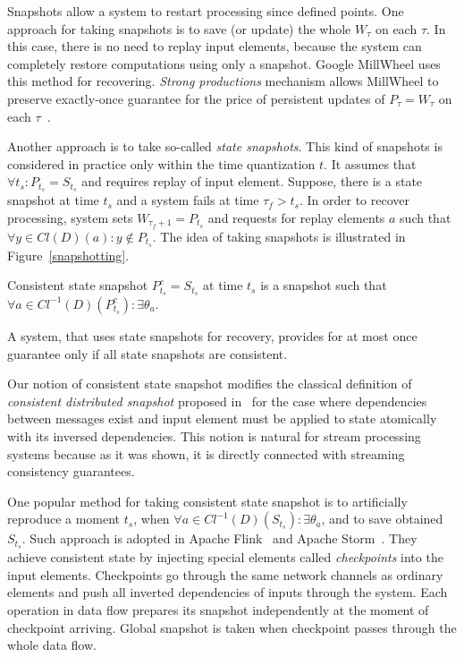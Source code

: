 Snapshots allow a system to restart processing since defined points. One approach for taking snapshots is to save (or update) the whole $W_{\tau}$ on each $\tau$. In this case, there is no need to replay input elements, because the system can completely restore computations using only a snapshot. Google MillWheel uses this method for recovering. {\em Strong productions} mechanism allows MillWheel to preserve exactly-once guarantee for the price of persistent updates of $P_\tau=W_\tau$ on each $\tau$~\cite{Akidau:2013:MFS:2536222.2536229}.    

Another approach is to take so-called {\em state snapshots}. This kind of snapshots is considered in practice only within the time quantization $t$. It assumes that $\forall{t_s}:P_{t_s}=S_{t_s}$ and requires replay of input element. Suppose, there is a state snapshot at time $t_s$ and a system fails at time $\tau_f>t_s$. In order to recover processing, system sets $W_{\tau_f+1}=P_{t_s}$ and requests for replay elements $a$ such that $\forall{y\in{Cl(D)(a)}}:y\notin{P_{t_s}}$. The idea of taking snapshots is illustrated in Figure~\ref{snapshotting}.

\begin{definition}{Consistent state snapshot}
$P^{c}_{t_s}=S_{t_s}$ at time $t_s$ is a snapshot such that $\forall{a}\in{Cl^{-1}(D)(P^{c}_{t_s})}:\exists{\theta_a}$.
\end{definition}

\begin{theorem}
A system, that uses state snapshots for recovery, provides for at most once guarantee only if all state snapshots are consistent.  
\end{theorem}

Our notion of consistent state snapshot modifies the classical definition of {\em consistent distributed snapshot} proposed in~\cite{Chandy:1985:DSD:214451.214456} for the case where dependencies between messages exist and input element must be applied to state atomically with its inversed dependencies. This notion is natural for stream processing systems because as it was shown, it is directly connected with streaming consistency guarantees. 

One popular method for taking consistent state snapshot is to artificially reproduce a moment $t_s$, when $\forall{a}\in{Cl^{-1}(D)(S_{t_s})}:\exists{\theta_a}$, and to save obtained $S_{t_s}$. Such approach is adopted in Apache Flink~\cite{Carbone:2017:SMA:3137765.3137777} and Apache Storm~\cite{apache:storm:state}. They achieve consistent state by injecting special elements called {\em checkpoints} into the input elements. Checkpoints go through the same network channels as ordinary elements and push all inverted dependencies of inputs through the system. Each operation in data flow prepares its snapshot independently at the moment of checkpoint arriving. Global snapshot is taken when checkpoint passes through the whole data flow. 

